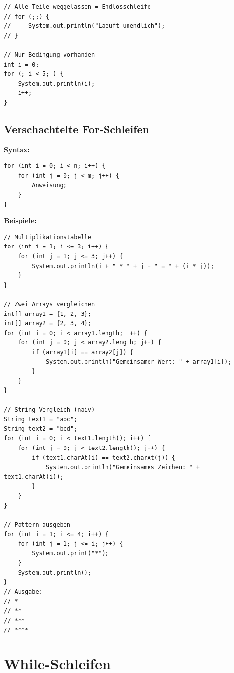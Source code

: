 \begin{lstlisting}
// Alle Teile weggelassen = Endlosschleife
// for (;;) {
//     System.out.println("Laeuft unendlich");
// }

// Nur Bedingung vorhanden
int i = 0;
for (; i < 5; ) {
    System.out.println(i);
    i++;
}
\end{lstlisting}

\newpage


\subsection*{Verschachtelte For-Schleifen}

\textbf{Syntax:}
\begin{lstlisting}
for (int i = 0; i < n; i++) {
    for (int j = 0; j < m; j++) {
        Anweisung;
    }
}
\end{lstlisting}

\textbf{Beispiele:}
\begin{lstlisting}
// Multiplikationstabelle
for (int i = 1; i <= 3; i++) {
    for (int j = 1; j <= 3; j++) {
        System.out.println(i + " * " + j + " = " + (i * j));
    }
}

// Zwei Arrays vergleichen
int[] array1 = {1, 2, 3};
int[] array2 = {2, 3, 4};
for (int i = 0; i < array1.length; i++) {
    for (int j = 0; j < array2.length; j++) {
        if (array1[i] == array2[j]) {
            System.out.println("Gemeinsamer Wert: " + array1[i]);
        }
    }
}

// String-Vergleich (naiv)
String text1 = "abc";
String text2 = "bcd";
for (int i = 0; i < text1.length(); i++) {
    for (int j = 0; j < text2.length(); j++) {
        if (text1.charAt(i) == text2.charAt(j)) {
            System.out.println("Gemeinsames Zeichen: " + text1.charAt(i));
        }
    }
}

// Pattern ausgeben
for (int i = 1; i <= 4; i++) {
    for (int j = 1; j <= i; j++) {
        System.out.print("*");
    }
    System.out.println();
}
// Ausgabe:
// *
// **
// ***
// ****
\end{lstlisting}

\newpage


\section*{While-Schleifen}

